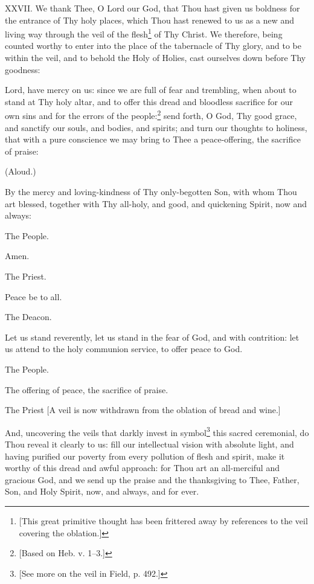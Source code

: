 XXVII. We thank Thee, O Lord our God, that Thou hast given us boldness for the entrance of Thy holy places, which Thou hast renewed to us as a new and living way through the veil of the flesh\footnote{\par{}  [This great primitive thought has been frittered away by references to the veil covering the oblation.]} of Thy Christ. We therefore, being counted worthy to enter into the place of the tabernacle of Thy glory, and to be within the veil, and to behold the Holy of Holies, cast ourselves down before Thy goodness:

Lord, have mercy on us: since we are full of fear and trembling, when about to stand at Thy holy altar, and to offer this dread and bloodless sacrifice for our own sins and for the errors of the people:\footnote{\par{}  [Based on Heb. v. 1–3.]} send forth, O God, Thy good grace, and sanctify our souls, and bodies, and spirits; and turn our thoughts to holiness, that with a pure conscience we may bring to Thee a peace-offering, the sacrifice of praise:

(Aloud.)

By the mercy and loving-kindness of Thy only-begotten Son, with whom Thou art blessed, together with Thy all-holy, and good, and quickening Spirit, now and always:

The People.

Amen.

The Priest.

Peace be to all.

The Deacon.

Let us stand reverently, let us stand in the fear of God, and with contrition: let us attend to the holy communion service, to offer peace to God.

The People.

The offering of peace, the sacrifice of praise.

The Priest [A veil is now withdrawn from the oblation of bread and wine.]

And, uncovering the veils that darkly invest in symbol\footnote{\par{}  [See more on the veil in Field, p. 492.]} this sacred ceremonial, do Thou reveal it clearly to us: fill our intellectual vision with absolute light, and having purified our poverty from every pollution of flesh and spirit, make it worthy of this dread and awful approach: for Thou art an all-merciful and gracious God, and we send up the praise and the thanksgiving to Thee, Father, Son, and Holy Spirit, now, and always, and for ever.

